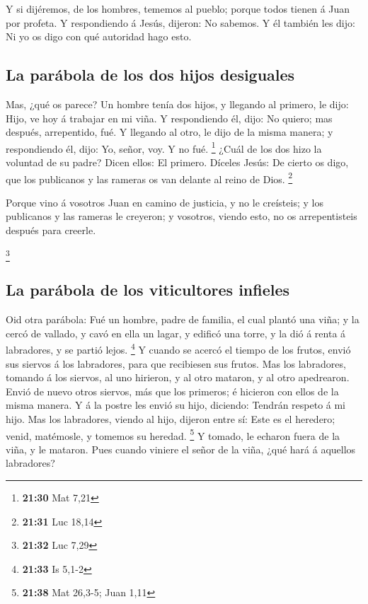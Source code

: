  Y si dijéremos, de los hombres, tememos al pueblo;
porque todos tienen á Juan por profeta.  Y respondiendo á
Jesús, dijeron: No sabemos. Y él también les dijo: Ni yo os digo con qué
autoridad hago esto.

\hypertarget{la-paruxe1bola-de-los-dos-hijos-desiguales}{%
\subsection{La parábola de los dos hijos
desiguales}\label{la-paruxe1bola-de-los-dos-hijos-desiguales}}

 Mas, ¿qué os parece? Un hombre tenía dos hijos, y
llegando al primero, le dijo: Hijo, ve hoy á trabajar en mi viña.
 Y respondiendo él, dijo: No quiero; mas después,
arrepentido, fué.  Y llegando al otro, le dijo de la
misma manera; y respondiendo él, dijo: Yo, señor, voy. Y no fué.
\footnote{\textbf{21:30} Mat 7,21}  ¿Cuál de los dos hizo
la voluntad de su padre? Dicen ellos: El primero. Díceles Jesús: De
cierto os digo, que los publicanos y las rameras os van delante al reino
de Dios. \footnote{\textbf{21:31} Luc 18,14}

 Porque vino á vosotros Juan en camino de justicia, y no
le creísteis; y los publicanos y las rameras le creyeron; y vosotros,
viendo esto, no os arrepentisteis después para creerle.

\footnote{\textbf{21:32} Luc 7,29}

\hypertarget{la-paruxe1bola-de-los-viticultores-infieles}{%
\subsection{La parábola de los viticultores
infieles}\label{la-paruxe1bola-de-los-viticultores-infieles}}

 Oid otra parábola: Fué un hombre, padre de familia, el
cual plantó una viña; y la cercó de vallado, y cavó en ella un lagar, y
edificó una torre, y la dió á renta á labradores, y se partió lejos.
\footnote{\textbf{21:33} Is 5,1-2}  Y cuando se acercó el
tiempo de los frutos, envió sus siervos á los labradores, para que
recibiesen sus frutos.  Mas los labradores, tomando á los
siervos, al uno hirieron, y al otro mataron, y al otro apedrearon.
 Envió de nuevo otros siervos, más que los primeros; é
hicieron con ellos de la misma manera.  Y á la postre les
envió su hijo, diciendo: Tendrán respeto á mi hijo.  Mas
los labradores, viendo al hijo, dijeron entre sí: Este es el heredero;
venid, matémosle, y tomemos su heredad. \footnote{\textbf{21:38} Mat
  26,3-5; Juan 1,11}  Y tomado, le echaron fuera de la
viña, y le mataron.  Pues cuando viniere el señor de la
viña, ¿qué hará á aquellos labradores?

